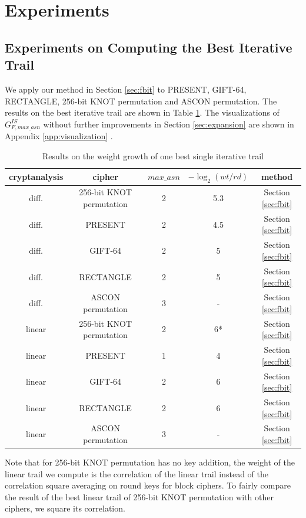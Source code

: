 \section{Experiments\label{sec:experiment}}

\subsection{Experiments on Computing the Best Iterative Trail}

We apply our method in Section \ref{sec:fbit} to PRESENT, GIFT-64, RECTANGLE, 256-bit KNOT permutation and ASCON permutation. The results on the best iterative trail are shown in Table \ref{tab:it}. The visualizations of $G^{IS}_{F,max\_asn}$ without further improvements in Section \ref{sec:expansion} are shown in Appendix \ref{app:visualization} .

\begin{table}
	\caption{Results on the weight growth of one best single iterative trail}\label{tab:it}
	\centering
	\begin{tabular}{|c|c|c|c|c|}
		\hline
		cryptanalysis & cipher & $max\_asn$ & $-\log_2(wt/rd)$ & method\\
		\hline
		diff. & 256-bit KNOT permutation & 2 & 5.3 & Section \ref{sec:fbit}\\
		\hline
		diff. & PRESENT & 2 & 4.5 & Section \ref{sec:fbit}\\
		\hline
		diff. & GIFT-64 & 2 & 5 & Section \ref{sec:fbit}\\
		\hline
		diff. & RECTANGLE & 2 & 5 & Section \ref{sec:fbit}\\
		\hline
		diff. & ASCON permutation & 3 & - & Section \ref{sec:fbit}\\
		\hline
		linear & 256-bit KNOT permutation & 2 & 6* & Section \ref{sec:fbit}\\
		\hline
		linear & PRESENT & 1 & 4 & Section \ref{sec:fbit}\\
		\hline
		linear & GIFT-64 & 2 & 6 & Section \ref{sec:fbit}\\
		\hline
		linear & RECTANGLE & 2 & 6 & Section \ref{sec:fbit}\\
		\hline
		linear & ASCON permutation & 3 & - & Section \ref{sec:fbit}\\
		\hline
	\end{tabular}
\end{table}

Note that for 256-bit KNOT permutation has no key addition, the weight of the linear trail we compute is the correlation of the linear trail instead of the correlation square averaging on round keys for block ciphers. To fairly compare the result of the best linear trail of 256-bit KNOT permutation with other ciphers, we square its correlation.

